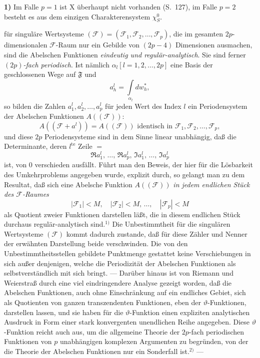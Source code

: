 \documentclass{article}
\begin{document}
\textbf{1)} Im Falle $p = 1$ ist $\mathrm{X}$ überhaupt nicht vorhanden (S.~127), im Falle $p = 2$ besteht es aus dem einzigen Charakterensystem $\chi_S^0$.

für singuläre Wertsysteme $(\mathcal{F}) = (\mathcal{F}_1, \mathcal{F}_2, \dots, \mathcal{F}_p)$, die im gesamten $2p$-dimensionalen $\mathcal{F}$-Raum nur ein Gebilde von $(2p - 4)$ Dimensionen ausmachen, sind die Abelschen Funktionen \emph{eindeutig und regulär-analytisch}. Sie sind ferner \emph{$(2p)$-fach periodisch}. Ist nämlich $\alpha_l [l = 1, 2, \dots, 2p]$ eine Basis der geschlossenen Wege auf $\mathfrak{F}$ und
\[ a_h^l = \int\limits_{\alpha_l} dw_h^*, \]
so bilden die Zahlen $a_1^l, a_2^l, \dots, a_p^l$ für jeden Wert des Index $l$ ein Periodensystem der Abelschen Funktionen $A((\mathcal{F}))$:
\[ A((\mathcal{F} + a^l)) = A((\mathcal{F})) \text{ identisch in } \mathcal{F}_1, \mathcal{F}_2, \dots, \mathcal{F}_p, \]
und diese $2p$ Periodensysteme sind in dem Sinne linear unabhängig, daß die Determinante, deren $l^{\text{te}}$ Zeile $=$
\[ \Re a_1^l, \, \dots, \, \Re a_p^l, \, \Im a_1^l, \, \dots, \, \Im a_p^l \]
ist, von 0 verschieden ausfällt. Führt man den Beweis, der hier für die Lösbarkeit des Umkehrproblems angegeben wurde, explizit durch, so gelangt man zu dem Resultat, daß sich eine Abelsche Funktion $A((\mathcal{F}))$ \emph{in jedem endlichen Stück des $\mathcal{F}$-Raumes}
\[ |\mathcal{F}_1| < M, \quad |\mathcal{F}_2| < M, \, \dots, \quad |\mathcal{F}_p| < M \]
als Quotient zweier Funktionen darstellen läßt, die in diesem endlichen Stück durchaus regulär-analytisch sind.${}^{1)}$ Die Unbestimmtheit für die singulären Wertsysteme $(\mathcal{F})$ kommt dadurch zustande, daß für diese Zähler und Nenner der erwähnten Darstellung beide verschwinden. Die von den Unbestimmtheitsstellen gebildete Punktmenge gestattet keine Verschiebungen in sich außer denjenigen, welche die Periodizität der Abelschen Funktionen als selbstverständlich mit sich bringt. --- Darüber hinaus ist von Riemann und Weierstraß durch eine viel eindringendere Analyse gezeigt worden, daß die Abelschen Funktionen, auch ohne Einschränkung auf ein endliches Gebiet, sich als Quotienten von ganzen transzendenten Funktionen, eben der $\vartheta$-Funktionen, darstellen lassen, und sie haben für die $\vartheta$-Funktion einen expliziten analytischen Ausdruck in Form einer stark konvergenten unendlichen Reihe angegeben. Diese $\vartheta$-Funktion reicht auch aus, um die allgemeine Theorie der $2p$-fach periodischen Funktionen von $p$ unabhängigen komplexen Argumenten zu begründen, von der die Theorie der Abelschen Funktionen nur ein Sonderfall ist.${}^{2)}$ ---
\end{document}
